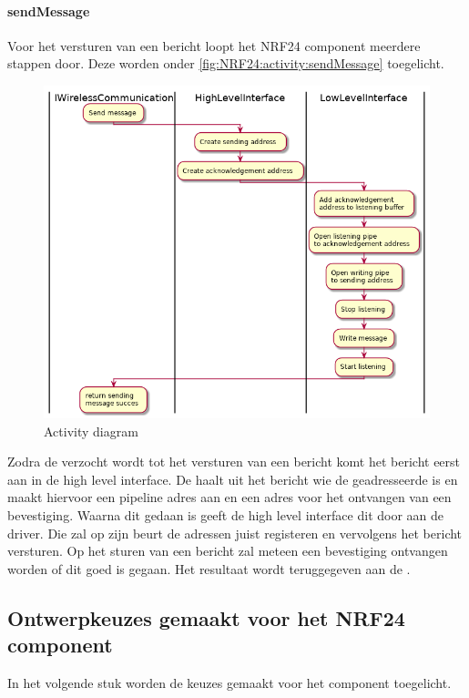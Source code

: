 \documentclass[a4paper, 11pt, oneside]{report}
\begin{document}
\paragraph{sendMessage}
\label{DetailedDesign:NRF24:activity:recieveMessage}
Voor het versturen van een bericht loopt het NRF24 component meerdere stappen door. Deze worden onder \autoref{fig:NRF24:activity:sendMessage} toegelicht.
\begin{figure}[H]
	\begin{center}\includegraphics[width=.9\linewidth]{UML/out/NRF24/activity/sendMessage/sendMessage.png}\end{center}
	\caption{Activity diagram }
	\label{fig:NRF24:activity:sendMessage}
\end{figure}
Zodra de  verzocht wordt tot het versturen van een bericht komt het bericht eerst aan in de high level interface.
De haalt uit het bericht wie de geadresseerde is en maakt hiervoor een pipeline adres aan en een adres voor het ontvangen van een bevestiging.
Waarna dit gedaan is geeft de high level interface dit door aan de driver.
Die zal op zijn beurt de adressen juist registeren en vervolgens het bericht versturen.
Op het sturen van een bericht zal meteen een bevestiging ontvangen worden of dit goed is gegaan.
Het resultaat wordt teruggegeven aan de .


\subsection{Ontwerpkeuzes gemaakt voor het NRF24 component}
\label{DetailedDesign:NRF24:ontwerkeuzes}
In het volgende stuk worden de keuzes gemaakt voor het component toegelicht.
\end{document}
